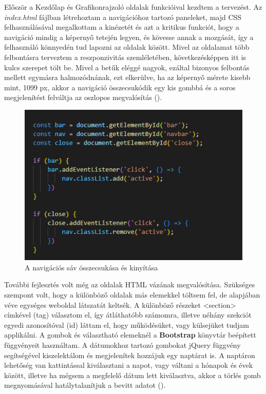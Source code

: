 Először a Kezdőlap és Grafikonrajzoló oldalak funkcióival kezdtem a tervezést. Az \emph{index.html} fájlban létrehoztam a navigációhoz tartozó paneleket, majd CSS felhasználásával megalkottam a kinézetét és azt a kritikus funkciót, hogy a navigáció mindig a képernyő tetején legyen, és kövesse annak a mozgását, így a felhasználó könnyedén tud lapozni az oldalak között. Mivel az oldalamat több felbontásra terveztem a reszponzivitás szemléletében, következésképpen itt is kulcs szerepet tölt be. Mivel a betűk eléggé nagyok, ezáltal bizonyos felbontás mellett egymásra halmozódnának, ezt elkerülve, ha az képernyő mérete kisebb mint, 1099 px, akkor a navigáció összecsukódik egy kis gombbá és a soros megjelenítést felváltja az oszlopos megvalósítás ().

\begin{figure}[h]
\centering
\includegraphics[scale=0.8]{images/navbarFunction.png}
\caption{A navigációs sáv összecsukása és kinyítása}
\label{fig:navbarfunc}
\end{figure}

További fejlesztés volt még az oldalak HTML vázának megvalósítása. Szükséges szempont volt, hogy a különböző oldalak más elemekkel töltsem fel, de alapjában véve egységes weboldal látszatát keltsék. A különböző részeket <section> címkével (tag) választom el, így átláthatóbb számomra, illetve néhány szekciót egyedi azonosítóval (id) láttam el, hogy működésüket, vagy külsejüket tudjam applikálni. A gombok és választható elemeknél a \textbf{Bootstrap} könyvtár beépített függvényeit használtam. A dátumokhoz tartozó gombokat jQuery függvény segítségével kiszelektálom és megjelenítek hozzájuk egy naptárat is. A naptáron lehetőség van kattintással kiválasztani a napot, vagy váltani a hónapok és évek között, illetve ha mégsem a megfelelő dátum lett kiválasztva, akkor a törlés gomb megnyomásával hatálytalanítjuk a bevitt adatot ().

